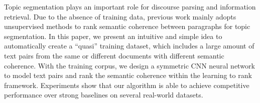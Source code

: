 Topic segmentation plays an important role for discourse parsing and information retrieval. Due to the absence of training data, previous work mainly adopts unsupervised methods to rank semantic coherence between paragraphs for topic segmentation. In this paper, we present an intuitive and simple idea to automatically create a ``quasi'' training dataset, which includes a large amount of text pairs from the same or different documents with different semantic coherence. With the training corpus, we design a symmetric CNN neural network to model text pairs and rank the semantic coherence within the learning to rank framework. Experiments show that our algorithm is able to achieve competitive performance over strong baselines on several real-world datasets.
